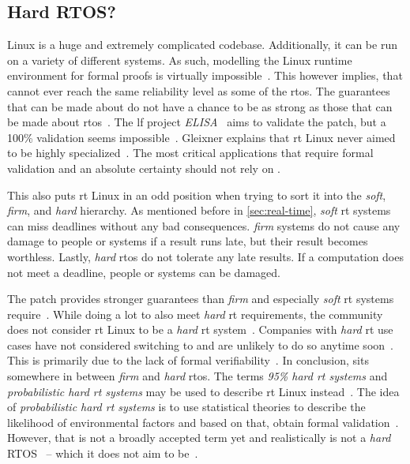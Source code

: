 \documentclass[10pt,twocolumn,a4paper]{article}
\begin{document}
\subsection{Hard RTOS?}
Linux is a huge and extremely complicated codebase.
Additionally, it can be run on a variety of different systems.
As such, modelling the Linux runtime environment for formal proofs is virtually impossible~\cite{reghenzani_realtime_2019}.
This however implies, that  cannot ever reach the same reliability level as some of the \acrshort{rtos}.
The guarantees that can be made about  do not have a chance to be as strong as those that can be made about \acrshort{rtos}~\cite{reghenzani_realtime_2019}.
The \acrfull{lf} project \emph{ELISA}~\cite{elisa_2025} aims to validate the patch, but a 100\% validation seems impossible~\cite{perlow_trenches_2021}.
Gleixner explains that \acrshort{rt} Linux never aimed to be highly specialized~\cite{perlow_trenches_2021}.
The most critical applications that require formal validation and an absolute certainty should not rely on .

This also puts \acrshort{rt} Linux in an odd position when trying to sort it into the \emph{soft}, \emph{firm}, and \emph{hard} hierarchy.
As mentioned before in \autoref{sec:real-time}, \emph{soft} \acrshort{rt} systems can miss deadlines without any bad consequences.
\emph{firm} systems do not cause any damage to people or systems if a result runs late, but their result becomes worthless.
Lastly, \emph{hard} \acrshort{rtos} do not tolerate any late results.
If a computation does not meet a deadline, people or systems can be damaged.

The  patch provides stronger guarantees than \emph{firm} and especially \emph{soft} \acrshort{rt} systems require~\cite{reghenzani_realtime_2019}.
While doing a lot to also meet \emph{hard} \acrshort{rt} requirements, the community does not consider \acrshort{rt} Linux to be a \emph{hard} \acrshort{rt} system~\cite{barbieri_rt-linux_rtos}.
Companies with \emph{hard} \acrshort{rt} use cases have not considered switching to  and are unlikely to do so anytime soon~\cite{reghenzani_realtime_2019}.
This is primarily due to the lack of formal verifiability~\cite{reghenzani_realtime_2019}.
In conclusion,  sits somewhere in between \emph{firm} and \emph{hard} \acrshort{rtos}.
The terms \emph{95\% hard \acrshort{rt} systems} and \emph{probabilistic hard \acrshort{rt} systems} may be used to describe \acrshort{rt} Linux instead~\cite{reghenzani_realtime_2019}.
The idea of \emph{probabilistic hard \acrshort{rt} systems} is to use statistical theories to describe the likelihood of environmental factors and based on that, obtain formal validation~\cite{reghenzani_realtime_2019}.
However, that is not a broadly accepted term yet and realistically  is not a \emph{hard} RTOS~\cite{reghenzani_realtime_2019} -- which it does not aim to be~\cite{perlow_trenches_2021}.
\end{document}

